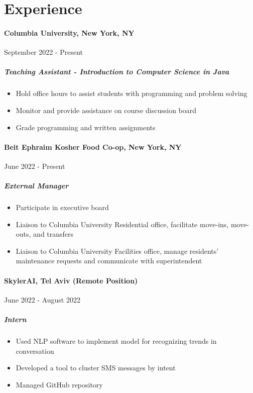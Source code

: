 \documentclass[12pt]{article}
\begin{document}

\vfill
\section*{Experience}

\paragraph*{Columbia University, New York, NY} \hfill September 2022 - Present
\subparagraph*{Teaching Assistant - Introduction to Computer Science in Java}
\begin{itemize}
    \item Hold office hours to assist students with programming and problem
    solving
    \item Monitor and provide assistance on course discussion board
    \item Grade programming and written assignments
\end{itemize}

\paragraph*{Beit Ephraim Kosher Food Co-op, New York, NY} \hfill June 2022 - Present
\subparagraph*{External Manager}
\begin{itemize}
    \item Participate in executive board
    \item Liaison to Columbia University Residential office, facilitate
    move-ins, move-outs, and transfers
    \item Liaison to Columbia University Facilities office, manage residents'
    maintenance requests and communicate with superintendent
\end{itemize}

\paragraph*{SkylerAI, Tel Aviv (Remote Position)} \hfill June 2022 - August 2022
\subparagraph*{Intern}
\begin{itemize}
    \item Used NLP software to implement model for recognizing trends in
    conversation
    \item Developed a tool to cluster SMS messages by intent
    \item Managed GitHub repository
\end{itemize}
\end{document}
